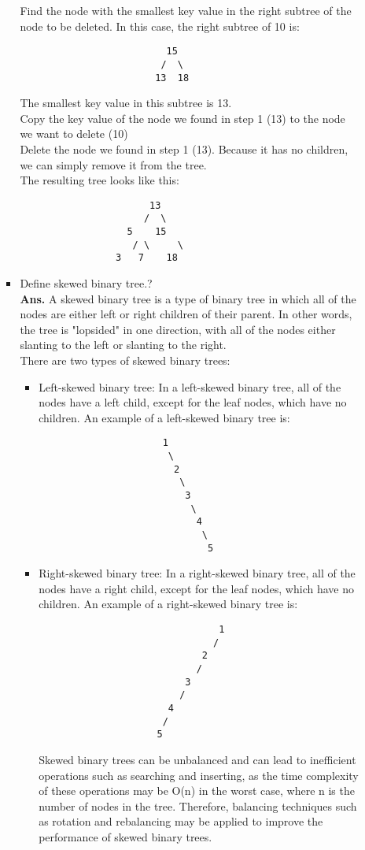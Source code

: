 \documentclass{article}
\begin{document}
\begin{enumerate}
\begin{enumerate}
\begin{itemize}
			Find the node with the smallest key value in the right subtree of the node to be deleted. In this case, the right subtree of 10 is:
			\begin{lstlisting}
					      15
					     /  \
					    13  18
			\end{lstlisting}
			The smallest key value in this subtree is 13.\\
			
			Copy the key value of the node we found in step 1 (13) to the node we want to delete (10)\\
			
			Delete the node we found in step 1 (13). Because it has no children, we can simply remove it from the tree.\\
			
			The resulting tree looks like this:
			\begin{lstlisting}
					   13
					  /  \
				   5    15
					/ \     \
				 3   7    18
			\end{lstlisting}
		\item Define skewed binary tree.?\\
		
		\textbf{Ans.}  A skewed binary tree is a type of binary tree in which all of the nodes are either left or right children of their parent. In other words, the tree is "lopsided" in one direction, with all of the nodes either slanting to the left or slanting to the right.\\
		
		There are two types of skewed binary trees:
		\begin{itemize}
			\item Left-skewed binary tree: In a left-skewed binary tree, all of the nodes have a left child, except for the leaf nodes, which have no children. An example of a left-skewed binary tree is:
			\begin{lstlisting}
				      1
				       \
				        2
				         \
				          3
				           \
				            4
				             \
				              5
			\end{lstlisting}
			\item Right-skewed binary tree: In a right-skewed binary tree, all of the nodes have a right child, except for the leaf nodes, which have no children. An example of a right-skewed binary tree is:
			\begin{lstlisting}
				                1
				               /
				             2
				            /
				          3
				         /
				       4
				      /
				     5
			\end{lstlisting}
			Skewed binary trees can be unbalanced and can lead to inefficient operations such as searching and inserting, as the time complexity of these operations may be O(n) in the worst case, where n is the number of nodes in the tree. Therefore, balancing techniques such as rotation and rebalancing may be applied to improve the performance of skewed binary trees.
		\end{itemize}
		\end{itemize}
\end{enumerate}
\end{enumerate}
\end{document}
